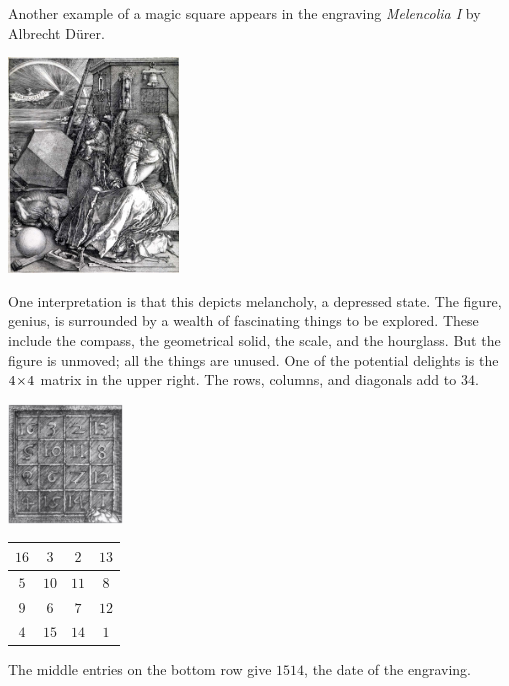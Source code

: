 Another example of a magic square appears in the engraving
\textit{Melencolia I} by Albrecht D\"urer.
\begin{center}
  \includegraphics[height=2.25in]{Melencolia.jpg} %
\end{center}
One interpretation is that this depicts melancholy, a depressed state.
The figure, genius,
is surrounded by a wealth of fascinating things to be explored.
These include
the compass, the geometrical solid, the scale, and the hourglass.
But the figure is unmoved; all the things are unused.
One of the potential delights is the $4 \! \times \! 4$ matrix in the upper right.
The rows, columns, and diagonals add to $34$.
\begin{center}
  \includegraphics[height=1.25in]{Melencoliadetail.jpg} %
  \qquad
  \begin{tabular}[b]{|c|c|c|c|}
    \hline
      $16$  &$3$  &$2$  &$13$  \\ \hline
      $5$   &$10$ &$11$ &$8$   \\ \hline
      $9$   &$6$  &$7$  &$12$  \\ \hline    
      $4$   &$15$ &$14$ &$1$  \\ \hline    
  \end{tabular}
\end{center}
The middle entries on the bottom row give $1514$, the 
date of the engraving.

